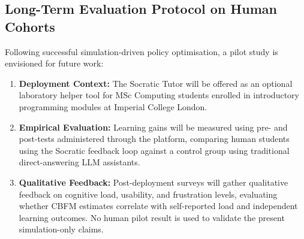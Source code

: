 \documentclass[11pt,a4paper]{report}
\begin{document}
\subsection{Long-Term Evaluation Protocol on Human Cohorts}
Following successful simulation-driven policy optimisation, a pilot study is envisioned for future work:
\begin{enumerate}
    \item \textbf{Deployment Context:} The Socratic Tutor will be offered as an optional laboratory helper tool for MSc Computing students enrolled in introductory programming modules at Imperial College London.
    \item \textbf{Empirical Evaluation:} Learning gains will be measured using pre- and post-tests administered through the platform, comparing human students using the Socratic feedback loop against a control group using traditional direct-answering LLM assistants.
    \item \textbf{Qualitative Feedback:} Post-deployment surveys will gather qualitative feedback on cognitive load, usability, and frustration levels, evaluating whether CBFM estimates correlate with self-reported load and independent learning outcomes. No human pilot result is used to validate the present simulation-only claims.
\end{enumerate}
\end{document}
